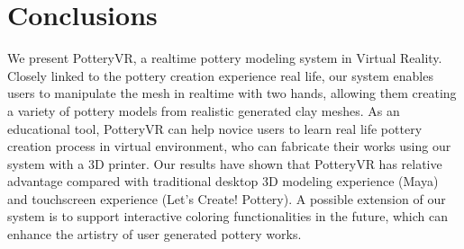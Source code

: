 \documentclass{svjour3}                     %
\begin{document}
\section{Conclusions}
\label{sec:8}

We present PotteryVR, a realtime pottery modeling system in Virtual Reality.
Closely linked to the pottery creation experience real life, our system enables users to manipulate the mesh in realtime with two hands, allowing them creating a variety of pottery models from realistic generated clay meshes.
As an educational tool, PotteryVR can help novice users to learn real life pottery creation process in virtual environment, who can fabricate their works using our system with a 3D printer.
Our results have shown that PotteryVR has relative advantage compared with traditional desktop 3D modeling experience (Maya) and touchscreen experience (Let's Create! Pottery).
A possible extension of our system is to support interactive coloring functionalities in the future, which can enhance the artistry of user generated pottery works.


\begin{acknowledgements}
\end{acknowledgements}


%
%
\end{document}
